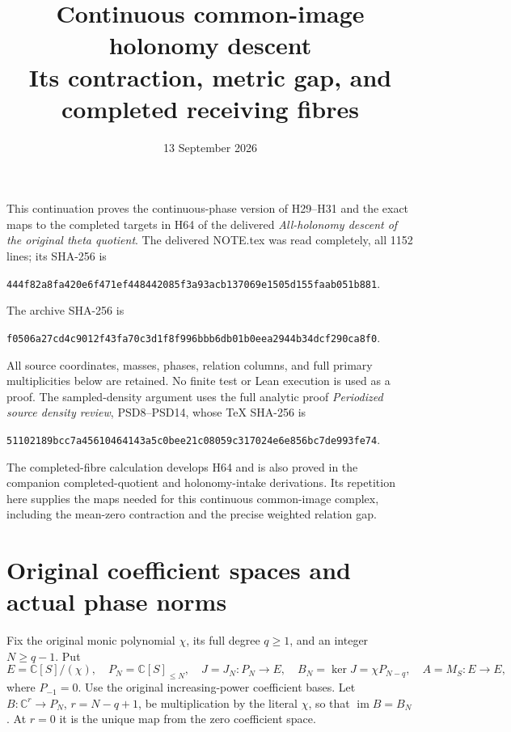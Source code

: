 \documentclass[11pt]{article}
\title{Continuous common-image holonomy descent\\
Its contraction, metric gap, and completed receiving fibres}
\author{}
\date{13 September 2026}
\newcommand{\C}{\mathbb C}
\newcommand{\im}{\operatorname{im}}
\begin{document}
\maketitle

This continuation proves the continuous-phase version of H29--H31
and the exact maps to the completed targets in H64 of the delivered
\emph{All-holonomy descent of the original theta quotient}.
The delivered NOTE.tex was read completely, all 1152 lines;
its SHA-256 is
\begin{center}\small
\texttt{444f82a8fa420e6f471ef448442085f3a93acb137069e1505d155faab051b881}.
\end{center}
The archive SHA-256 is
\begin{center}\small
\texttt{f0506a27cd4c9012f43fa70c3d1f8f996bbb6db01b0eea2944b34dcf290ca8f0}.
\end{center}
All source coordinates, masses, phases, relation columns, and full
primary multiplicities below are retained. No finite test or Lean
execution is used as a proof.
The sampled-density argument uses the full analytic proof
\emph{Periodized source density review}, PSD8--PSD14,
whose TeX SHA-256 is
\begin{center}\small
\texttt{51102189bcc7a45610464143a5c0bee21c08059c317024e6e856bc7de993fe74}.
\end{center}
The completed-fibre calculation develops H64 and is also proved
in the companion completed-quotient and holonomy-intake derivations.
Its repetition here supplies the maps needed for this continuous
common-image complex, including the mean-zero contraction and
the precise weighted relation gap.

\section{Original coefficient spaces and actual phase norms}

Fix the original monic polynomial $\chi$, its full degree $q\ge1$,
and an integer $N\ge q-1$. Put
\[
 E=\C[S]/(\chi),\quad P_N=\C[S]_{\le N},\quad
 J=J_N:P_N\longrightarrow E,\quad
 B_N=\ker J=\chi P_{N-q},\quad A=M_S:E\longrightarrow E,
 \tag{HCD1}
\]
where $P_{-1}=0$. Use the original increasing-power coefficient
bases. Let $B:\C^r\to P_N$, $r=N-q+1$, be multiplication by
the literal $\chi$, so that $\im B=B_N$. At $r=0$ it is the
unique map from the zero coefficient space.
\end{document}
